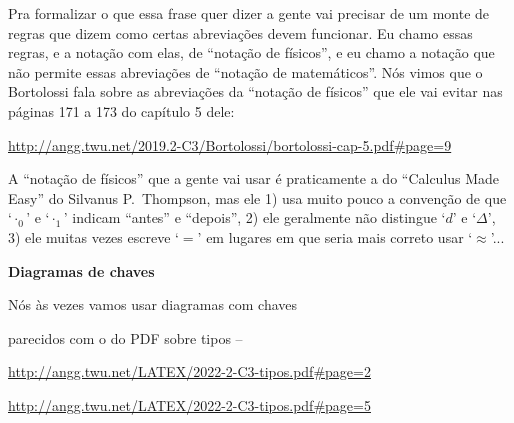 \documentclass[oneside,12pt]{article}
\begin{document}
{{Pra formalizar o que essa frase quer dizer a gente vai precisar de um
monte de regras que dizem como certas abreviações devem funcionar. Eu
chamo essas regras, e a notação com elas, de ``notação de físicos'', e
eu chamo a notação que não permite essas abreviações de ``notação de
matemáticos''. Nós vimos que o Bortolossi fala sobre as abreviações da
``notação de físicos'' que ele vai evitar nas páginas 171 a 173 do
capítulo 5 dele:

\ssk

{\scriptsize

\url{http://angg.twu.net/2019.2-C3/Bortolossi/bortolossi-cap-5.pdf\#page=9}

}

\ssk

A ``notação de físicos'' que a gente vai usar é praticamente a do
``Calculus Made Easy'' do Silvanus P.~Thompson, mas ele 1) usa muito
pouco a convenção de que `$·_0$' e `$·_1$' indicam ``antes'' e
``depois'', 2) ele geralmente não distingue `$d$' e `$Δ$', 3) ele
muitas vezes escreve `$=$' em lugares em que seria mais correto usar
`$≈$'...



}}

\newpage


{\bf Diagramas de chaves}

Nós às vezes vamos usar diagramas com chaves

parecidos com o do PDF sobre tipos --

\ssk

{\footnotesize

\url{http://angg.twu.net/LATEX/2022-2-C3-tipos.pdf#page=2}

\url{http://angg.twu.net/LATEX/2022-2-C3-tipos.pdf#page=5}

}
\end{document}
